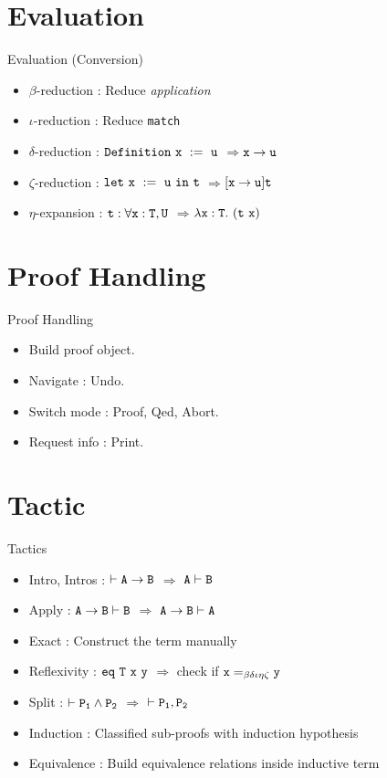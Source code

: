 \documentclass[UTF-8]{beamer}
\begin{document}
\section{Evaluation}
\begin{frame}{Evaluation (Conversion)}
\begin{itemize}
    \item $\beta$-reduction : Reduce \textit{application}
    \item $\iota$-reduction : Reduce {\tt match}
    \item $\delta$-reduction : $\tt Definition\ x\ :=\ u$ \quad $\Rightarrow$\quad $\tt x\to u$
    \item $\zeta$-reduction : $\tt let\ x\ :=\ u\ in\ t$ \quad $\Rightarrow$\quad $\tt [x\to u]t$
    \item $\eta$-expansion : $\tt t:\forall x:T,U$ \quad $\Rightarrow$\quad $\tt \lambda x:T.\ (t\ x)$
\end{itemize}
\end{frame}

\section{Proof Handling}
\begin{frame}{Proof Handling}
\begin{itemize}
\item Build proof object.
\item Navigate : Undo.
\item Switch mode : Proof, Qed, Abort.
\item Request info : Print.
\end{itemize}
\end{frame}

\section{Tactic}
\begin{frame}{Tactics}
\begin{itemize}
\item Intro, Intros : $\tt \vdash A\to B$ $\Rightarrow$ $\tt A\vdash B$
\item Apply : $\tt A\to B\vdash B$ $\Rightarrow$ $\tt A\to B\vdash A$
\item Exact : Construct the term manually
\item Reflexivity : $\tt eq\ T\ x\ y$ $\Rightarrow$ check if $\tt x=_{\beta\delta\iota\eta\zeta}y$
\item Split : $\tt \vdash P_1\wedge P_2$ $\Rightarrow$ $\tt \vdash P_1,P_2$
\item Induction : Classified sub-proofs with induction hypothesis
\item Equivalence : Build equivalence relations inside inductive term
\end{itemize}
\end{frame}
\end{document}
